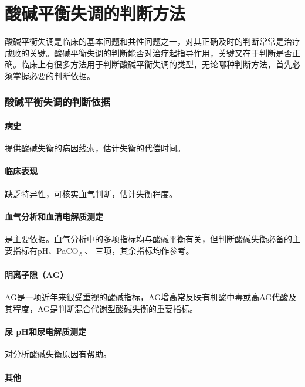 \section{酸碱平衡失调的判断方法}

酸碱平衡失调是临床的基本问题和共性问题之一，对其正确及时的判断常常是治疗成败的关键。酸碱平衡失调的判断能否对治疗起指导作用，关键又在于判断是否正确。临床上有很多方法用于判断酸碱平衡失调的类型，无论哪种判断方法，首先必须掌握必要的判断依据。

\subsubsection{酸碱平衡失调的判断依据}

\paragraph{病史}

提供酸碱失衡的病因线索，估计失衡的代偿时间。

\paragraph{临床表现}

缺乏特异性，可核实血气判断，估计失衡程度。

\paragraph{血气分析和血清电解质测定}

是主要依据。血气分析中的多项指标均与酸碱平衡有关，但判断酸碱失衡必备的主要指标有pH、PaCO\textsubscript{2}
、{} 三项，其余指标均作参考。

\paragraph{阴离子隙（AG）}

AG是一项近年来很受重视的酸碱指标，AG增高常反映有机酸中毒或高AG代酸及其程度，AG是判断混合代谢型酸碱失衡的重要指标。

\paragraph{尿 pH和尿电解质测定}

对分析酸碱失衡原因有帮助。

\paragraph{其他}

